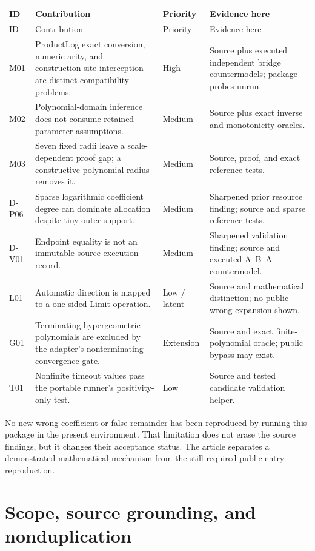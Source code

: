 \documentclass[11pt,a4paper]{article}
\theoremstyle{remark}
\begin{document}
\begin{longtable}{@{}L{17mm}L{72mm}L{22mm}L{35mm}@{}}
\toprule
ID & Contribution & Priority & Evidence here\\\midrule
\endfirsthead
\toprule ID & Contribution & Priority & Evidence here\\\midrule
\endhead
M01 & ProductLog exact conversion, numeric arity, and construction-site interception are distinct compatibility problems. & High & Source plus executed independent bridge countermodels; package probes unrun.\\
M02 & Polynomial-domain inference does not consume retained parameter assumptions. & Medium & Source plus exact inverse and monotonicity oracles.\\
M03 & Seven fixed radii leave a scale-dependent proof gap; a constructive polynomial radius removes it. & Medium & Source, proof, and exact reference tests.\\
D-P06 & Sparse logarithmic coefficient degree can dominate allocation despite tiny outer support. & Medium & Sharpened prior resource finding; source and sparse reference tests.\\
D-V01 & Endpoint equality is not an immutable-source execution record. & Medium & Sharpened validation finding; source and executed A--B--A countermodel.\\
L01 & Automatic direction is mapped to a one-sided Limit operation. & Low / latent & Source and mathematical distinction; no public wrong expansion shown.\\
G01 & Terminating hypergeometric polynomials are excluded by the adapter's nonterminating convergence gate. & Extension & Source and exact finite-polynomial oracle; public bypass may exist.\\
T01 & Nonfinite timeout values pass the portable runner's positivity-only test. & Low & Source and tested candidate validation helper.\\
\bottomrule
\end{longtable}

No new wrong coefficient or false remainder has been reproduced by running this package in the present environment. That limitation does not erase the source findings, but it changes their acceptance status. The article separates a demonstrated mathematical mechanism from the still-required public-entry reproduction.

\section{Scope, source grounding, and nonduplication}
\end{document}
